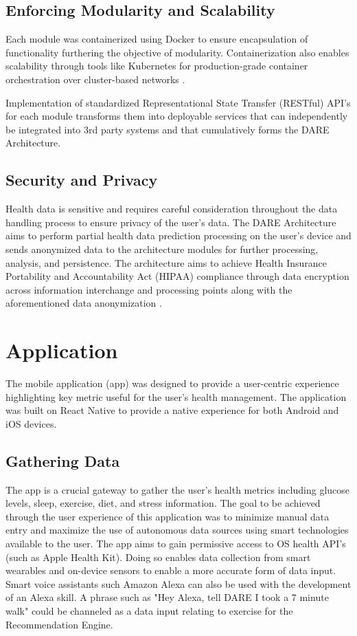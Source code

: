 \subsection{Enforcing Modularity and Scalability}
Each module was containerized using Docker to ensure encapsulation of functionality furthering the objective of modularity. Containerization also enables scalability through tools like Kubernetes for production-grade container orchestration over cluster-based networks \cite{18}.

Implementation of standardized Representational State Transfer (RESTful) API's for each module transforms them into deployable services that can independently be integrated into 3rd party systems and that cumulatively forms the DARE Architecture.

\subsection{Security and Privacy}
Health data is sensitive and requires careful consideration throughout the data handling process to ensure privacy of the user's data. The DARE Architecture aims to perform partial health data prediction processing on the user's device and sends anonymized data to the architecture modules for further processing, analysis, and persistence.
\bigbreak
The architecture aims to achieve Health Insurance Portability and Accountability Act (HIPAA) compliance through data encryption across information interchange and processing points along with the aforementioned data anonymization \cite{19}.

\bigbreak


\section{Application}
\label{sec:engineering_professionalism}
The mobile application (app) was designed to provide a user-centric experience highlighting key metric useful for the user's health management. The application was built on React Native to provide a native experience for both Android and iOS devices. 

\subsection{Gathering Data}
The app is a crucial gateway to gather the user's health metrics including glucose levels, sleep, exercise, diet, and stress information.
The goal to be achieved through the user experience of this application was to minimize manual data entry and maximize the use of autonomous data sources using smart technologies available to the user. The app aims to gain permissive access to OS health API's (such as Apple Health Kit). Doing so enables data collection from smart wearables and on-device sensors to enable a more accurate form of data input.
Smart voice assistants such Amazon Alexa can also be used with the development of an Alexa skill. A phrase such as "Hey Alexa, tell DARE I took a 7 minute walk" could be channeled as a data input relating to exercise for the Recommendation Engine.

